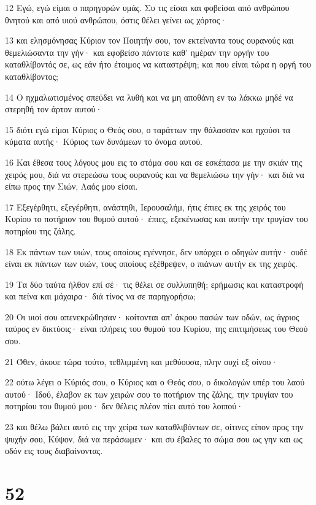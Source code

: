 \par 12 Εγώ, εγώ είμαι ο παρηγορών υμάς. Συ τις είσαι και φοβείσαι από ανθρώπου θνητού και από υιού ανθρώπου, όστις θέλει γείνει ως χόρτος·
\par 13 και ελησμόνησας Κύριον τον Ποιητήν σου, τον εκτείναντα τους ουρανούς και θεμελιώσαντα την γήν· και εφοβείσο πάντοτε καθ' ημέραν την οργήν του καταθλίβοντός σε, ως εάν ήτο έτοιμος να καταστρέψη; και που είναι τώρα η οργή του καταθλίβοντος;
\par 14 Ο ηχμαλωτισμένος σπεύδει να λυθή και να μη αποθάνη εν τω λάκκω μηδέ να στερηθή τον άρτον αυτού·
\par 15 διότι εγώ είμαι Κύριος ο Θεός σου, ο ταράττων την θάλασσαν και ηχούσι τα κύματα αυτής· Κύριος των δυνάμεων το όνομα αυτού.
\par 16 Και έθεσα τους λόγους μου εις το στόμα σου και σε εσκέπασα με την σκιάν της χειρός μου, διά να στερεώσω τους ουρανούς και να θεμελιώσω την γήν· και διά να είπω προς την Σιών, Λαός μου είσαι.
\par 17 Εξεγέρθητι, εξεγέρθητι, ανάστηθι, Ιερουσαλήμ, ήτις έπιες εκ της χειρός του Κυρίου το ποτήριον του θυμού αυτού· έπιες, εξεκένωσας και αυτήν την τρυγίαν του ποτηρίου της ζάλης.
\par 18 Εκ πάντων των υιών, τους οποίους εγέννησε, δεν υπάρχει ο οδηγών αυτήν· ουδέ είναι εκ πάντων των υιών, τους οποίους εξέθρεψεν, ο πιάνων αυτήν εκ της χειρός.
\par 19 Τα δύο ταύτα ήλθον επί σέ· τις θέλει σε συλλυπηθή; ερήμωσις και καταστροφή και πείνα και μάχαιρα· διά τίνος να σε παρηγορήσω;
\par 20 Οι υιοί σου απενεκρώθησαν· κοίτονται απ' άκρου πασών των οδών, ως άγριος ταύρος εν δικτύοις· είναι πλήρεις του θυμού του Κυρίου, της επιτιμήσεως του Θεού σου.
\par 21 Όθεν, άκουε τώρα τούτο, τεθλιμμένη και μεθύουσα, πλην ουχί εξ οίνου·
\par 22 ούτω λέγει ο Κύριός σου, ο Κύριος και ο Θεός σου, ο δικολογών υπέρ του λαού αυτού· Ιδού, έλαβον εκ των χειρών σου το ποτήριον της ζάλης, την τρυγίαν του ποτηρίου του θυμού μου· δεν θέλεις πλέον πίει αυτό του λοιπού·
\par 23 και θέλω βάλει αυτό εις την χείρα των καταθλιβόντων σε, οίτινες είπον προς την ψυχήν σου, Κύψον, διά να περάσωμεν· και συ έβαλες το σώμα σου ως γην και ως οδόν εις τους διαβαίνοντας.

\chapter{52}

